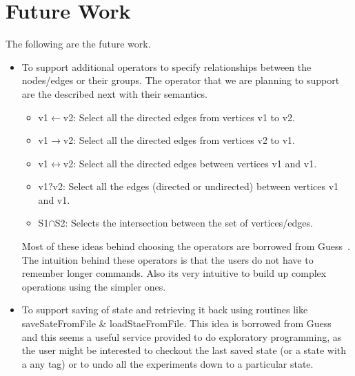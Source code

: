 \documentclass[12,twoside]{article}
\begin{document}
\section{Future Work}
The following are the future work.
  \begin{itemize}
    \item To support  additional operators to specify relationships between the 
    nodes/edges or their groups. The operator that we are planning to support 
    are the described next with their semantics.

    \begin{itemize}
      \item v1$\leftarrow$v2: Select all the directed edges from vertices v1 to 
      v2.
      \item v1$\rightarrow$v2: Select all the directed edges from vertices v2 to 
      v1.
      \item v1$\leftrightarrow$v2: Select all the directed edges between 
      vertices v1 and v1.
      \item v1$?$v2: Select all the edges (directed or undirected) between 
      vertices v1 and v1.
      \item S1$\cap$S2: Selects the intersection between the set of
      vertices/edges.
    \end{itemize}
      Most of these ideas behind choosing the operators are borrowed from 
      Guess~\cite{Adar}. The intuition behind these operators is that the users 
      do not have to remember longer commands. Also its very intuitive to build 
      up complex operations using the simpler ones.

    \item To support saving of state and retrieving it back using
    routines like saveSateFromFile \& loadStaeFromFile.
    This idea is borrowed from Guess~\cite{Adar} and this seems a useful service 
    provided to do exploratory programming, as the user might be interested to 
    checkout the last saved state  (or a state with a any tag) or to undo all 
    the experiments down to a particular state.

  \end{itemize}
\end{document}
